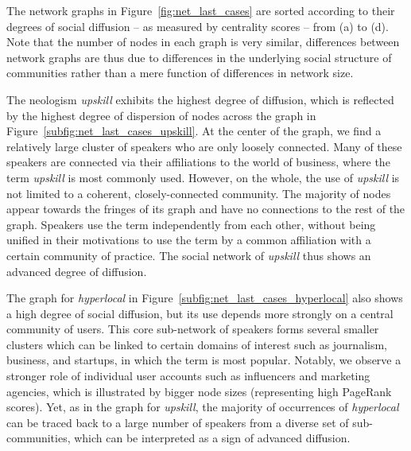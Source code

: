 \documentclass[
  a4paper,
  abstract=on,
  captions=tableabove,
  ]{scrartcl}
\newcommand{\ol}[1]{\emph{#1}}
\begin{document}
      The network graphs in Figure~\ref{fig:net_last_cases} are sorted according to their degrees of social diffusion -- as measured by centrality scores -- from (a) to (d). Note that the number of nodes in each graph is very similar, differences between network graphs are thus due to differences in the underlying social structure of communities rather than a mere function of differences in network size.

      The neologism \ol{upskill} exhibits the highest degree of diffusion, which is reflected by the highest degree of dispersion of nodes across the graph in Figure~\ref{subfig:net_last_cases_upskill}. At the center of the graph, we find a relatively large cluster of speakers who are only loosely connected. Many of these speakers are connected via their affiliations to the world of business, where the term \ol{upskill} is most commonly used. However, on the whole, the use of \ol{upskill} is not limited to a coherent, closely-connected community. The majority of nodes appear towards the fringes of its graph and have no connections to the rest of the graph. Speakers use the term independently from each other, without being unified in their motivations to use the term by a common affiliation with a certain community of practice. The social network of \ol{upskill} thus shows an advanced degree of diffusion.

      The graph for \ol{hyperlocal} in Figure~\ref{subfig:net_last_cases_hyperlocal} also shows a high degree of social diffusion, but its use depends more strongly on a central community of users. This core sub-network of speakers forms several smaller clusters which can be linked to certain domains of interest such as journalism, business, and startups, in which the term is most popular. Notably, we observe a stronger role of individual user accounts such as influencers and marketing agencies, which is illustrated by bigger node sizes (representing  high PageRank scores). Yet, as in the graph for \ol{upskill}, the majority of occurrences of \ol{hyperlocal} can be traced back to a large number of speakers from a diverse set of sub-communities, which can be interpreted as a sign of advanced diffusion.
\end{document}
